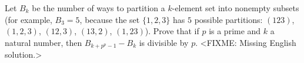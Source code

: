 \problem{}
Let $B_k$ be the number of ways to partition a $k$-element set into nonempty
subsets (for example, $B_3 = 5$, because the set $\{1, 2, 3\}$ has $5$ possible
partitions:
$(1 2 3)$, $(1, 2, 3)$, $(1 2, 3)$, $(1 3, 2)$, $(1, 2 3)$).
Prove that if $p$ is a prime and $k$ a natural number, then
$B_{k + p^p - 1} - B_k$ is divisible by $p$.
\solution
<FIXME: Missing English solution.>
\endproblem
